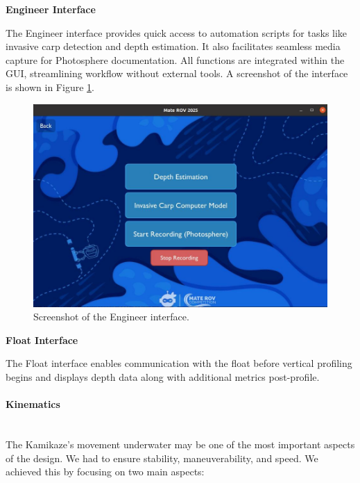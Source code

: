 \vspace{0.2cm}
\textbf{Engineer Interface}

The Engineer interface provides quick access to automation scripts for tasks like invasive carp detection and depth estimation. It also facilitates seamless media capture for Photosphere documentation. All functions are integrated within the GUI, streamlining workflow without external tools. A screenshot of the interface is shown in Figure \ref{fig:Engineer_interface}.

\begin{figure}[h]
    \centering
    \includegraphics[width=0.8\columnwidth]{Sections/2Design Rationale/images/Engineer_interface.jpeg}
    \caption{Screenshot of the Engineer interface.}
    \label{fig:Engineer_interface}
\end{figure}

\vspace{0.2cm}
\textbf{Float Interface}

The Float interface enables communication with the float before vertical profiling begins and displays depth data along with additional metrics post-profile.

\vspace{-0.3cm}
\paragraph{Kinematics} \ \\
The Kamikaze's movement underwater may be one of the most important aspects of the design. We had to ensure stability, maneuverability, and speed. We achieved this by focusing on two main aspects:

